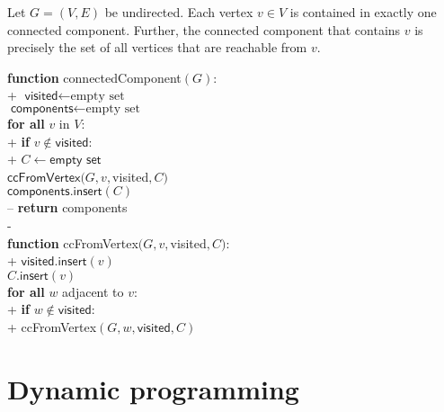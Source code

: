 \documentclass{article}
\begin{document}
\begin{corollary}
	Let $G=(V,E)$ be undirected. Each vertex $v\in V$ is contained in exactly
	one connected component. Further, the connected component that contains $v$
	is precisely the set of all vertices that are reachable from $v$.
\end{corollary}

\begin{pseudo}
	\textbf{function} \textsf{connectedComponent}$(G)$:									\\+
	$\textsf{visited}\leftarrow\text{empty set}$									\\
	$\textsf{components}\leftarrow\text{empty set}$									\\
	\textbf{for all} $v$ in $V$:													\\+
	\textbf{if} $v\not\in\textsf{visited}$:										\\+
	$C\leftarrow\textsf{empty set}$											\\
	$\textsf{ccFromVertex}(G, v, $\textsf{visited}$, C)$					\\
	$\textsf{components}.\textsf{insert}(C)$								\\--
	\textbf{return} \textsf{components}												\\-
	\\
	\textbf{function} \textsf{ccFromVertex}$(G, v, $\textsf{visited}$, C)$:				\\+
	$\textsf{visited}.\textsf{insert}(v)$											\\
	$C.\textsf{insert}(v)$															\\
	\textbf{for all} $w$ adjacent to $v$:											\\+
	\textbf{if} $w\not\in\textsf{visited}$:										\\+
	\textsf{ccFromVertex}$(G, w, \textsf{visited}, C)$
\end{pseudo}

\section{Dynamic programming}
\end{document}
